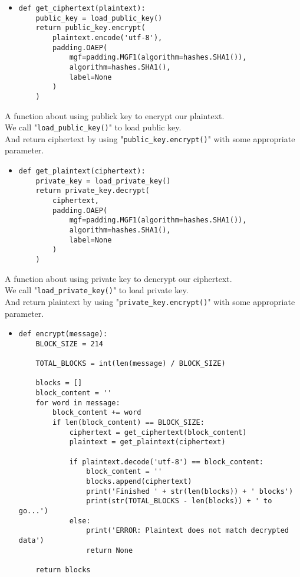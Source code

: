 \documentclass{article}
\begin{document}
\begin{itemize}
\item \begin{verbatim}def get_ciphertext(plaintext):
    public_key = load_public_key()
    return public_key.encrypt(
        plaintext.encode('utf-8'),
        padding.OAEP(
            mgf=padding.MGF1(algorithm=hashes.SHA1()),
            algorithm=hashes.SHA1(),
            label=None
        )
    )
\end{verbatim}
\end{itemize}

\noindent A function about using publick key to encrypt our plaintext.\\
We call "\verb|load_public_key()|" to load public key.\\
And return ciphertext by using "\verb|public_key.encrypt()|" with some appropriate parameter.

\begin{itemize}
\item \begin{verbatim}def get_plaintext(ciphertext):
    private_key = load_private_key()
    return private_key.decrypt(
        ciphertext,
        padding.OAEP(
            mgf=padding.MGF1(algorithm=hashes.SHA1()),
            algorithm=hashes.SHA1(),
            label=None
        )
    )
\end{verbatim}
\end{itemize}

\noindent A function about using private key to dencrypt our ciphertext.\\
We call "\verb|load_private_key()|" to load private key.\\
And return plaintext by using "\verb|private_key.encrypt()|" with some appropriate parameter.

\begin{itemize}
\item \begin{verbatim}def encrypt(message):
    BLOCK_SIZE = 214

    TOTAL_BLOCKS = int(len(message) / BLOCK_SIZE)

    blocks = []
    block_content = ''
    for word in message:
        block_content += word
        if len(block_content) == BLOCK_SIZE:
            ciphertext = get_ciphertext(block_content)
            plaintext = get_plaintext(ciphertext)

            if plaintext.decode('utf-8') == block_content:
                block_content = ''
                blocks.append(ciphertext)
                print('Finished ' + str(len(blocks)) + ' blocks')
                print(str(TOTAL_BLOCKS - len(blocks)) + ' to go...')
            else:
                print('ERROR: Plaintext does not match decrypted data')
                return None

    return blocks
\end{verbatim}
\end{itemize}
\end{document}
